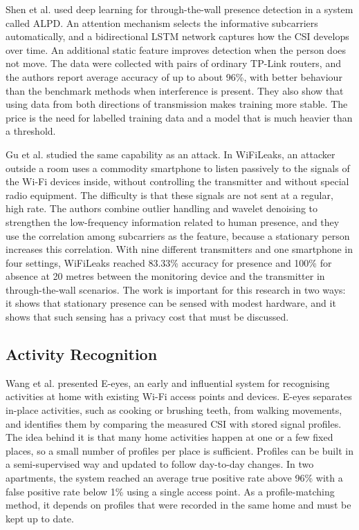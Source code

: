 Shen et al. \cite{alpd} used deep learning for through-the-wall presence detection in a system called ALPD. An attention mechanism selects the informative subcarriers automatically, and a bidirectional LSTM network captures how the CSI develops over time. An additional static feature improves detection when the person does not move. The data were collected with pairs of ordinary TP-Link routers, and the authors report average accuracy of up to about 96\%, with better behaviour than the benchmark methods when interference is present. They also show that using data from both directions of transmission makes training more stable. The price is the need for labelled training data and a model that is much heavier than a threshold.

Gu et al. \cite{wifileaks} studied the same capability as an attack. In WiFiLeaks, an attacker outside a room uses a commodity smartphone to listen passively to the signals of the Wi-Fi devices inside, without controlling the transmitter and without special radio equipment. The difficulty is that these signals are not sent at a regular, high rate. The authors combine outlier handling and wavelet denoising to strengthen the low-frequency information related to human presence, and they use the correlation among subcarriers as the feature, because a stationary person increases this correlation. With nine different transmitters and one smartphone in four settings, WiFiLeaks reached 83.33\% accuracy for presence and 100\% for absence at 20 metres between the monitoring device and the transmitter in through-the-wall scenarios. The work is important for this research in two ways: it shows that stationary presence can be sensed with modest hardware, and it shows that such sensing has a privacy cost that must be discussed.

\subsection{Activity Recognition}
Wang et al. \cite{eeyes} presented E-eyes, an early and influential system for recognising activities at home with existing Wi-Fi access points and devices. E-eyes separates in-place activities, such as cooking or brushing teeth, from walking movements, and identifies them by comparing the measured CSI with stored signal profiles. The idea behind it is that many home activities happen at one or a few fixed places, so a small number of profiles per place is sufficient. Profiles can be built in a semi-supervised way and updated to follow day-to-day changes. In two apartments, the system reached an average true positive rate above 96\% with a false positive rate below 1\% using a single access point. As a profile-matching method, it depends on profiles that were recorded in the same home and must be kept up to date.

